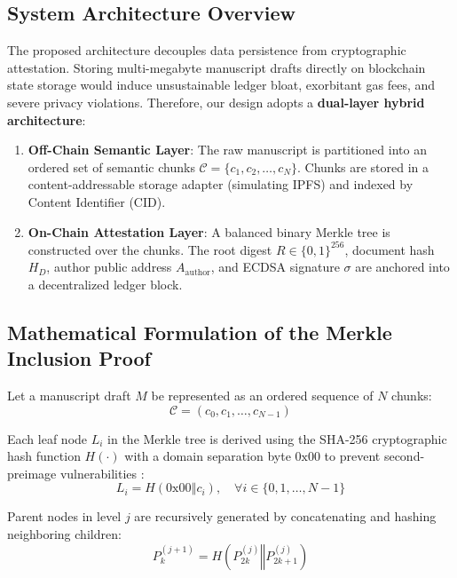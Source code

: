\documentclass[conference]{IEEEtran}
\begin{document}
\subsection{System Architecture Overview}
The proposed architecture decouples data persistence from cryptographic attestation. Storing multi-megabyte manuscript drafts directly on blockchain state storage would induce unsustainable ledger bloat, exorbitant gas fees, and severe privacy violations. Therefore, our design adopts a \textbf{dual-layer hybrid architecture}:
\begin{enumerate}
    \item \textbf{Off-Chain Semantic Layer}: The raw manuscript is partitioned into an ordered set of semantic chunks $\mathcal{C} = \{c_1, c_2, \dots, c_N\}$. Chunks are stored in a content-addressable storage adapter (simulating IPFS) and indexed by Content Identifier (CID).
    \item \textbf{On-Chain Attestation Layer}: A balanced binary Merkle tree is constructed over the chunks. The root digest $R \in \{0, 1\}^{256}$, document hash $H_D$, author public address $A_{\text{author}}$, and ECDSA signature $\sigma$ are anchored into a decentralized ledger block.
\end{enumerate}

\subsection{Mathematical Formulation of the Merkle Inclusion Proof}
Let a manuscript draft $M$ be represented as an ordered sequence of $N$ chunks:
\begin{equation}
\mathcal{C} = (c_0, c_1, \dots, c_{N-1})
\end{equation}

Each leaf node $L_i$ in the Merkle tree is derived using the SHA-256 cryptographic hash function $H(\cdot)$ with a domain separation byte $0\text{x}00$ to prevent second-preimage vulnerabilities \cite{merkle1987signature}:
\begin{equation}
L_i = H(0\text{x}00 \mathbin{\Vert} c_i), \quad \forall i \in \{0, 1, \dots, N-1\}
\end{equation}

Parent nodes in level $j$ are recursively generated by concatenating and hashing neighboring children:
\begin{equation}
P_{k}^{(j+1)} = H\left(P_{2k}^{(j)} \mathbin{\Vert} P_{2k+1}^{(j)}\right)
\end{equation}
\end{document}
